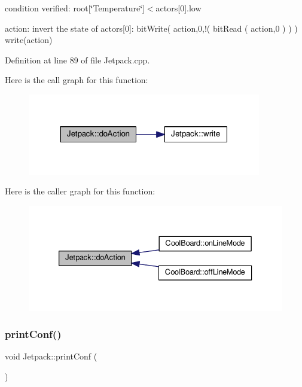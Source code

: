 condition verified\+: root\mbox{[}\char`\"{}\+Temperature\char`\"{}\mbox{]}$<$actors\mbox{[}0\mbox{]}.low

action\+: invert the state of actors\mbox{[}0\mbox{]}\+: bit\+Write( action,0,!( bit\+Read ( action,0 ) ) ) write(action) 

Definition at line 89 of file Jetpack.\+cpp.

Here is the call graph for this function\+:
\nopagebreak
\begin{figure}[H]
\begin{center}
\leavevmode
\includegraphics[width=289pt]{df/d1d/class_jetpack_a86d2e83436ef4b85f4c3a6e85ac785b0_cgraph}
\end{center}
\end{figure}
Here is the caller graph for this function\+:
\nopagebreak
\begin{figure}[H]
\begin{center}
\leavevmode
\includegraphics[width=333pt]{df/d1d/class_jetpack_a86d2e83436ef4b85f4c3a6e85ac785b0_icgraph}
\end{center}
\end{figure}
\mbox{\label{class_jetpack_ac54a7bb4f9166bee32052253d9b1d306}} 
\subsubsection{\texorpdfstring{print\+Conf()}{printConf()}}
{\footnotesize\ttfamily void Jetpack\+::print\+Conf (\begin{DoxyParamCaption}{ }\end{DoxyParamCaption})}

